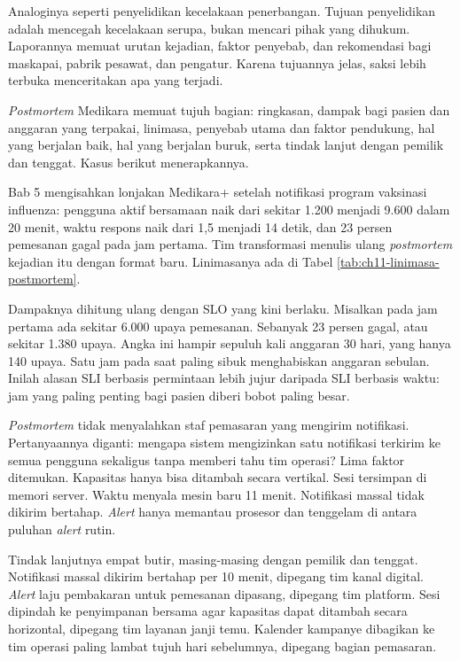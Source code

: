 Analoginya seperti penyelidikan kecelakaan penerbangan. Tujuan penyelidikan adalah mencegah
kecelakaan serupa, bukan mencari pihak yang dihukum. Laporannya memuat urutan kejadian, faktor
penyebab, dan rekomendasi bagi maskapai, pabrik pesawat, dan pengatur. Karena tujuannya jelas,
saksi lebih terbuka menceritakan apa yang terjadi.

\textit{Postmortem} Medikara memuat tujuh bagian: ringkasan, dampak bagi pasien dan anggaran yang
terpakai, linimasa, penyebab utama dan faktor pendukung, hal yang berjalan baik, hal yang
berjalan buruk, serta tindak lanjut dengan pemilik dan tenggat. Kasus berikut menerapkannya.

\begin{kasus}[title={Kasus Medikara Health: Postmortem Gangguan Medikara+ saat Program Vaksinasi}]
  Bab 5 mengisahkan lonjakan Medikara+ setelah notifikasi program vaksinasi influenza: pengguna
  aktif bersamaan naik dari sekitar 1.200 menjadi 9.600 dalam 20 menit, waktu respons naik dari 1,5
  menjadi 14 detik, dan 23 persen pemesanan gagal pada jam pertama. Tim transformasi menulis ulang
  \textit{postmortem} kejadian itu dengan format baru. Linimasanya ada di Tabel
  \ref{tab:ch11-linimasa-postmortem}.

  Dampaknya dihitung ulang dengan SLO yang kini berlaku. Misalkan pada jam pertama ada sekitar
  6.000 upaya pemesanan. Sebanyak 23 persen gagal, atau sekitar 1.380 upaya. Angka ini hampir sepuluh
  kali anggaran 30 hari, yang hanya 140 upaya. Satu jam pada saat paling sibuk menghabiskan
  anggaran sebulan. Inilah alasan SLI berbasis permintaan lebih jujur daripada SLI berbasis waktu:
  jam yang paling penting bagi pasien diberi bobot paling besar.

  \textit{Postmortem} tidak menyalahkan staf pemasaran yang mengirim notifikasi. Pertanyaannya
  diganti: mengapa sistem mengizinkan satu notifikasi terkirim ke semua pengguna sekaligus tanpa
  memberi tahu tim operasi? Lima faktor ditemukan. Kapasitas hanya bisa ditambah secara vertikal.
  Sesi tersimpan di memori server. Waktu menyala mesin baru 11 menit. Notifikasi massal tidak
  dikirim bertahap. \textit{Alert} hanya memantau prosesor dan tenggelam di antara puluhan
  \textit{alert} rutin.

  Tindak lanjutnya empat butir, masing-masing dengan pemilik dan tenggat. Notifikasi massal dikirim
  bertahap per 10 menit, dipegang tim kanal digital. \textit{Alert} laju pembakaran untuk pemesanan
  dipasang, dipegang tim platform. Sesi dipindah ke penyimpanan bersama agar kapasitas dapat
  ditambah secara horizontal, dipegang tim layanan janji temu. Kalender kampanye dibagikan ke tim
  operasi paling lambat tujuh hari sebelumnya, dipegang bagian pemasaran.
\end{kasus}

